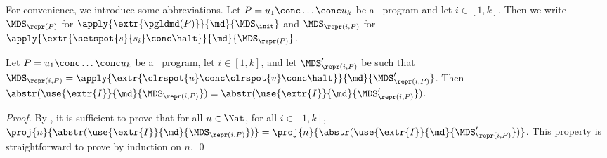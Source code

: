 \documentclass[fleqn]{llncs}
\begin{document}
For convenience, we introduce some abbreviations.
Let $P = u_1 \conc \ldots \conc u_k$ be a \PGLD\ program and let
$i \in [1,k]$.
Then we write $\MDS_{\repr(P)}$ for
$\apply{\extr{\pgldmd(P)}}{\md}{\MDS_\init}$ and $\MDS_{\repr(i,P)}$ for
$\apply{\extr{\setspot{s}{s_i} \conc \halt}}{\md}{\MDS_{\repr(P)}}$.

\begin{proposition}
\label{prop-interpretation}
Let $P = u_1 \conc \ldots \conc u_k$ be a \PGLD\ program,
let $i \in [1,k]$, and
let $\MDS'_{\repr(i,P)}$ be such that
$\MDS_{\repr(i,P)} =
 \apply{\extr{\clrspot{u} \conc \clrspot{v} \conc \halt}}{\md}
       {\MDS'_{\repr(i,P)}}$.
Then
$\abstr(\use{\extr{I}}{\md}{\MDS_{\repr(i,P)}}) =
 \abstr(\use{\extr{I}}{\md}{\MDS'_{\repr(i,P)}})$.
\end{proposition}
\begin{proof}
By \AIP, it is sufficient to prove that for all $n \in \Nat$, for all
$i \in [1,k]$,
$\proj{n}{\abstr(\use{\extr{I}}{\md}{\MDS_{\repr(i,P)}})} =
 \proj{n}{\abstr(\use{\extr{I}}{\md}{\MDS'_{\repr(i,P)}})}$.
This property is straightforward to prove by induction on $n$.
\qed
\end{proof}
\end{document}
